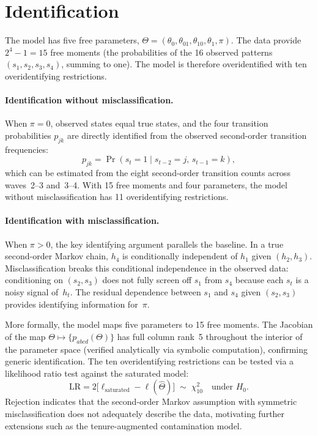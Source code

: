 \documentclass[12pt]{article}
\begin{document}
\section{Identification}
\label{sec:ar2_identification}

The model has five free parameters,
$\Theta = (\theta_0, \theta_{01}, \theta_{10}, \theta_1, \pi)$.
The data provide $2^4 - 1 = 15$ free moments (the probabilities of the
16 observed patterns $(s_1, s_2, s_3, s_4)$, summing to one). The model
is therefore overidentified with ten overidentifying restrictions.

\paragraph{Identification without misclassification.}
When $\pi = 0$, observed states equal true states, and the four
transition probabilities $p_{jk}$ are directly identified from the
observed second-order transition frequencies:
\[
p_{jk} = \Pr(s_t = 1 \mid s_{t-2} = j,\, s_{t-1} = k),
\]
which can be estimated from the eight second-order transition counts
across waves~2--3 and~3--4. With 15 free moments and four parameters,
the model without misclassification has 11 overidentifying restrictions.

\paragraph{Identification with misclassification.}
When $\pi > 0$, the key identifying argument parallels the baseline.
In a true second-order Markov chain, $h_4$ is conditionally independent
of $h_1$ given $(h_2, h_3)$. Misclassification breaks this conditional
independence in the observed data: conditioning on $(s_2, s_3)$ does not
fully screen off $s_1$ from $s_4$ because each $s_t$ is a noisy signal
of~$h_t$. The residual dependence between $s_1$ and $s_4$ given
$(s_2, s_3)$ provides identifying information for~$\pi$.

More formally, the model maps five parameters to 15 free moments.
The Jacobian of the map
$\Theta \mapsto \{p_{abcd}(\Theta)\}$ has full column rank~5
throughout the interior of the parameter space (verified analytically
via symbolic computation), confirming generic identification. The ten
overidentifying restrictions can be tested via a likelihood ratio test
against the saturated model:
\begin{equation}
\mathrm{LR} = 2\big[\ell_{\mathrm{saturated}} - \ell(\hat\Theta)\big]
\;\sim\; \chi^2_{10} \quad \text{under } H_0.
\label{eq:ar2_overid_test}
\end{equation}
Rejection indicates that the second-order Markov assumption with
symmetric misclassification does not adequately describe the data,
motivating further extensions such as the tenure-augmented
contamination model.
\end{document}
